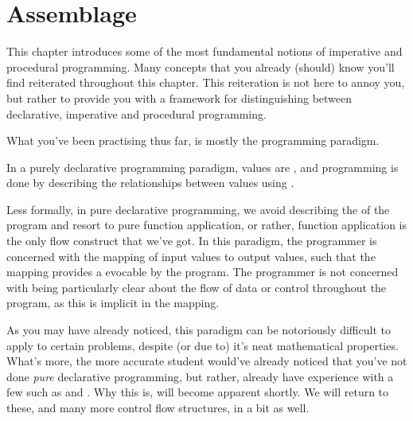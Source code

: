\chapter{Assemblage}

%
%
%
%
%


This chapter introduces some of the most fundamental notions of imperative and
procedural programming.  Many concepts that you already (should) know you'll
find reiterated throughout this chapter.  This reiteration is not here to annoy
you, but rather to provide you with a framework for distinguishing between
declarative, imperative and procedural programming.

\vspace{0.5in}

What you've been practising thus far, is mostly the 
programming paradigm.

\begin{definition}

In a purely declarative programming paradigm, values are , and
programming is done by describing the relationships between values using
.

\end{definition}


Less formally, in pure declarative programming, we avoid describing the
 of the program and resort to pure function application, or rather,
function application is the only flow construct that we've got.  In this
paradigm, the programmer is concerned with the mapping of input values to
output values, such that the mapping provides a 
evocable by the program. The programmer is not concerned with being
particularly clear about the flow of data or control throughout the program, as
this is implicit in the mapping.


As you may have already noticed, this paradigm can be notoriously difficult to
apply to certain problems, despite (or due to) it's neat mathematical
properties.  What's more, the more accurate student would've already noticed
that you've not done \emph{pure} declarative programming, but rather, already
have experience with a few  such as  and
 . Why this is, will become apparent shortly. We
will return to these, and many more control flow structures, in a bit as well.

